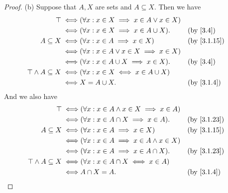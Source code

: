 \begin{proof}{(b)}
  Suppose that \(A, X\) are sets and \(A \subseteq X\).
  Then we have
  \begin{align*}
    \top \iff                     & (\forall x : x \in X \implies x \in A \lor x \in X)                                \\
    \iff                          & (\forall x : x \in X \implies x \in A \cup X).      &  & \text{(by \cref{3.4})}    \\
    A \subseteq X \iff            & (\forall x : x \in A \implies x \in X)              &  & \text{(by \cref{3.1.15})} \\
    \iff                          & (\forall x : x \in A \lor x \in X \implies x \in X)                                \\
    \iff                          & (\forall x : x \in A \cup X \implies x \in X).      &  & \text{(by \cref{3.4})}    \\
    \top \land A \subseteq X \iff & (\forall x : x \in X \iff x \in A \cup X)                                          \\
    \iff                          & X = A \cup X.                                       &  & \text{(by \cref{3.1.4})}
  \end{align*}
  And we also have
  \begin{align*}
    \top \iff                     & (\forall x : x \in A \land x \in X \implies x \in A)                                \\
    \iff                          & (\forall x : x \in A \cap X \implies x \in A).       &  & \text{(by \cref{3.1.23})} \\
    A \subseteq X \iff            & (\forall x : x \in A \implies x \in X)               &  & \text{(by \cref{3.1.15})} \\
    \iff                          & (\forall x : x \in A \implies x \in A \land x \in X)                                \\
    \iff                          & (\forall x : x \in A \implies x \in A \cap X).       &  & \text{(by \cref{3.1.23})} \\
    \top \land A \subseteq X \iff & (\forall x : x \in A \cap X \iff x \in A)                                           \\
    \iff                          & A \cap X = A.                                        &  & \text{(by \cref{3.1.4})}
  \end{align*}
\end{proof}

